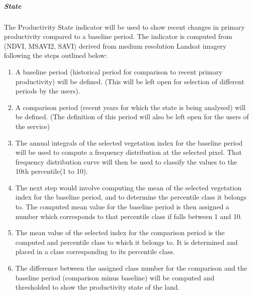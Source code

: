 \documentclass[letterpaper,10pt,english]{sphinxmanual}
\begin{document}
\subparagraph{State}
\label{\detokenize{Background/LD_indicators:state}}
\sphinxAtStartPar
The Productivity State indicator will be used to show recent changes in primary productivity compared to a baseline period. The indicator is computed from (NDVI, MSAVI2, SAVI) derived from medium resolution Landsat imagery following the steps outlined below:
\begin{enumerate}
%
\item {} 
\sphinxAtStartPar
A baseline period (historical period for comparison to recent primary productivity) will be defined. (This will be left open for selection of different periods by the users).

\item {} 
\sphinxAtStartPar
A comparison period (recent years for which the state is being analysed) will be defined. (The definition of this period will also be left open for the users of the service)

\item {} 
\sphinxAtStartPar
The annual integrals of the selected vegetation index for the baseline period will be used to compute a frequency distribution at the selected pixel. That frequency distribution curve will then be used to classify the values to the 10th percentile(1 to 10).

\item {} 
\sphinxAtStartPar
The next step would involve computing the mean of the selected vegetation index for the baseline period, and to determine the percentile class it belongs to. The computed mean value for the baseline period is then assigned a number which corresponds to that percentile class if falls between 1 and 10.

\item {} 
\sphinxAtStartPar
The mean value of the selected index for the comparison period is the computed and percentile class to which it belongs to. It is determined and placed in a class corresponding to its percentile class.

\item {} 
\sphinxAtStartPar
The difference between the assigned class number for the comparison and the baseline period (comparison minus baseline) will be computed and thresholded to show the productivity state of the land.

\end{enumerate}
\end{document}
